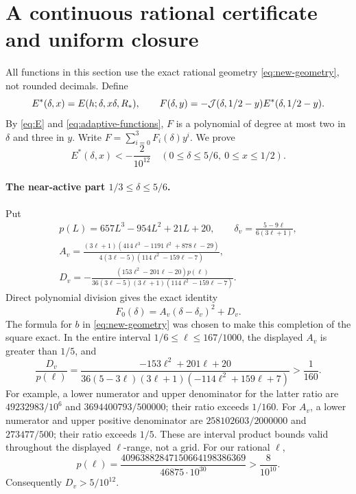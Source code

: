 \documentclass[12pt]{article}
\begin{document}
\section{A continuous rational certificate and uniform closure}\label{sec:closure}
All functions in this section use the exact rational geometry
\eqref{eq:new-geometry}, not rounded decimals.
Define
\[
 E^*(\delta,x)=E(h;\delta,x\delta,R_*),\qquad
 F(\delta,y)=-{\cal J}(\delta,1/2-y)E^*(\delta,1/2-y).
\]
By \eqref{eq:E} and \eqref{eq:adaptive-functions}, \(F\) is a
polynomial of degree at most two in \(\delta\) and three in \(y\).
Write \(F=\sum_{i=0}^3 F_i(\delta)y^i\).
We prove
\begin{equation}\label{eq:endpoint-margin}
 E^*(\delta,x)<-\frac{2}{10^{12}}
 \quad(0\le\delta\le5/6,\ 0\le x\le1/2).
\end{equation}

\paragraph{The near-active part \(1/3\le\delta\le5/6\).}
Put
\[
\begin{gathered}
 p(L)=657L^3-954L^2+21L+20,\qquad
 \delta_v=\frac{5-9\ell}{6(3\ell+1)},\\
 A_v=\frac{(3\ell+1)(414\ell^3-1191\ell^2+878\ell-29)}
             {4(3\ell-5)(114\ell^2-159\ell-7)},\\
 D_v=-\frac{(153\ell^2-201\ell-20)p(\ell)}
             {36(3\ell-5)(3\ell+1)(114\ell^2-159\ell-7)} .
\end{gathered}
\]
Direct polynomial division gives the exact identity
\begin{equation}\label{eq:square-cert}
 F_0(\delta)=A_v(\delta-\delta_v)^2+D_v.
\end{equation}
The formula for \(b\) in \eqref{eq:new-geometry} was chosen to
make this completion of the square exact.
In the entire interval \(1/6\le\ell\le167/1000\),
the displayed \(A_v\) is greater than \(1/5\), and
\[
 \frac{D_v}{p(\ell)}
 =\frac{-153\ell^2+201\ell+20}
       {36(5-3\ell)(3\ell+1)(-114\ell^2+159\ell+7)}
 >\frac1{160}.
\]
For example, a lower numerator and upper denominator for the latter
ratio are \(49232983/10^6\) and \(3694400793/500000\);
their ratio exceeds \(1/160\).
For \(A_v\), a lower numerator and upper positive denominator
are \(258102603/2000000\) and \(273477/500\);
their ratio exceeds \(1/5\).  These are interval product bounds
valid throughout the displayed \(\ell\)-range, not a grid.
For our rational \(\ell\),
\[
 p(\ell)=
 \frac{40963882847150664198386369}{46875\cdot10^{30}}
       >\frac{8}{10^{10}}.
\]
Consequently \(D_v>5/10^{12}\).
\end{document}

